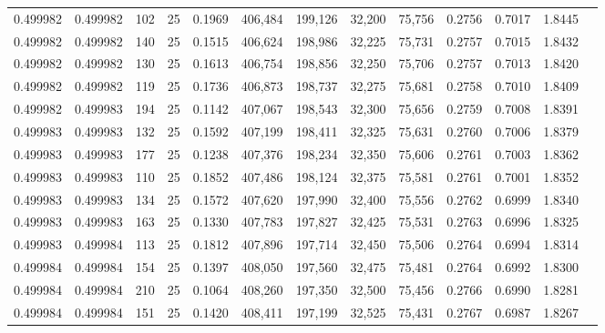 \begin{tabular}{rrrrrrrrrrrrr}
0.499982 & 0.499982 &   102 &  25 &                                     0.1969 & 406,484 & 199,126 &  32,200 &  75,756 & 0.2756 & 0.7017 & 1.8445 \\
0.499982 & 0.499982 &   140 &  25 &                                     0.1515 & 406,624 & 198,986 &  32,225 &  75,731 & 0.2757 & 0.7015 & 1.8432 \\
0.499982 & 0.499982 &   130 &  25 &                                     0.1613 & 406,754 & 198,856 &  32,250 &  75,706 & 0.2757 & 0.7013 & 1.8420 \\
0.499982 & 0.499982 &   119 &  25 &                                     0.1736 & 406,873 & 198,737 &  32,275 &  75,681 & 0.2758 & 0.7010 & 1.8409 \\
0.499982 & 0.499983 &   194 &  25 &                                     0.1142 & 407,067 & 198,543 &  32,300 &  75,656 & 0.2759 & 0.7008 & 1.8391 \\
0.499983 & 0.499983 &   132 &  25 &                                     0.1592 & 407,199 & 198,411 &  32,325 &  75,631 & 0.2760 & 0.7006 & 1.8379 \\
0.499983 & 0.499983 &   177 &  25 &                                     0.1238 & 407,376 & 198,234 &  32,350 &  75,606 & 0.2761 & 0.7003 & 1.8362 \\
0.499983 & 0.499983 &   110 &  25 &                                     0.1852 & 407,486 & 198,124 &  32,375 &  75,581 & 0.2761 & 0.7001 & 1.8352 \\
0.499983 & 0.499983 &   134 &  25 &                                     0.1572 & 407,620 & 197,990 &  32,400 &  75,556 & 0.2762 & 0.6999 & 1.8340 \\
0.499983 & 0.499983 &   163 &  25 &                                     0.1330 & 407,783 & 197,827 &  32,425 &  75,531 & 0.2763 & 0.6996 & 1.8325 \\
0.499983 & 0.499984 &   113 &  25 &                                     0.1812 & 407,896 & 197,714 &  32,450 &  75,506 & 0.2764 & 0.6994 & 1.8314 \\
0.499984 & 0.499984 &   154 &  25 &                                     0.1397 & 408,050 & 197,560 &  32,475 &  75,481 & 0.2764 & 0.6992 & 1.8300 \\
0.499984 & 0.499984 &   210 &  25 &                                     0.1064 & 408,260 & 197,350 &  32,500 &  75,456 & 0.2766 & 0.6990 & 1.8281 \\
0.499984 & 0.499984 &   151 &  25 &                                     0.1420 & 408,411 & 197,199 &  32,525 &  75,431 & 0.2767 & 0.6987 & 1.8267 \\

\end{tabular}
